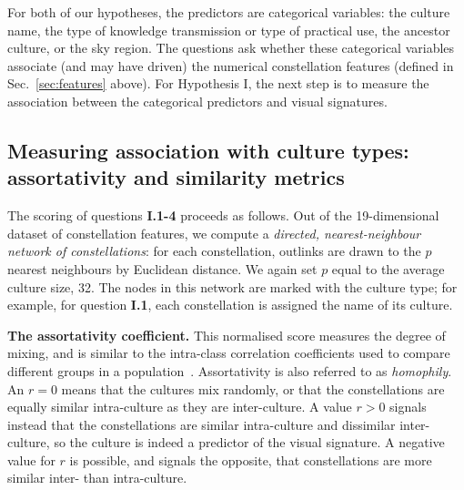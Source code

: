\documentclass[10pt]{article}
\begin{document}
For both of our hypotheses, the predictors are categorical variables: the culture name, the type of knowledge transmission or type of practical use, the ancestor culture, or the sky region. The questions ask whether these categorical variables associate (and may have driven) the numerical constellation features (defined in Sec.~\ref{sec:features} above). For Hypothesis I, the next step is to measure the association between the categorical predictors and visual signatures.

\subsection{Measuring association with culture types: assortativity and similarity metrics}
\label{sec:metrics}

The scoring of questions {\bf I.1-4} proceeds as follows. Out of the 19-dimensional dataset of constellation features, we compute a \emph{directed, nearest-neighbour network of constellations}: for each constellation, outlinks are drawn to the $p$ nearest neighbours by Euclidean distance. We again set $p$ equal to the average culture size, 32. The nodes in this network are marked with the culture type; for example, for question {\bf I.1}, each constellation is assigned the name of its culture.

{\bf The assortativity coefficient.} This normalised score measures the degree of mixing, and is similar to the intra-class correlation coefficients used to compare different groups in a population~\cite{fleiss2013statistical}. Assortativity is also referred to as \emph{homophily}. An $r=0$ means that the cultures mix randomly, or that the constellations are equally similar intra-culture as they are inter-culture. A value $r>0$ signals instead that the constellations are similar intra-culture and dissimilar inter-culture, so the culture is indeed a predictor of the visual signature. A negative value for $r$ is possible, and signals the opposite, that constellations are more similar inter- than intra-culture.
\end{document}
